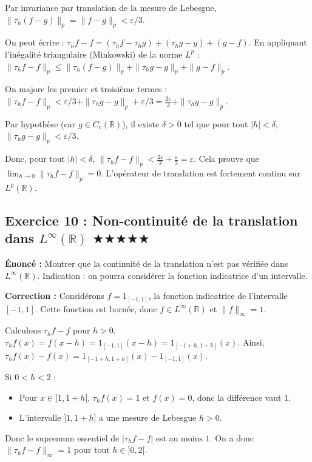 \documentclass[11pt,a4paper]{article}
\begin{document}
Par invariance par translation de la mesure de Lebesgue, $\|\tau_h(f - g)\|_p = \|f - g\|_p < \varepsilon / 3$.

On peut écrire :
$\tau_h f - f = (\tau_h f - \tau_h g) + (\tau_h g - g) + (g - f)$.
En appliquant l'inégalité triangulaire (Minkowski) de la norme $L^p$ :
$\|\tau_h f - f\|_p \le \|\tau_h(f - g)\|_p + \|\tau_h g - g\|_p + \|g - f\|_p$.

On majore les premier et troisième termes :
$\|\tau_h f - f\|_p < \varepsilon/3 + \|\tau_h g - g\|_p + \varepsilon/3 = \frac{2\varepsilon}{3} + \|\tau_h g - g\|_p$.

Par hypothèse (car $g \in C_c(\mathbb{R})$), il existe $\delta > 0$ tel que pour tout $|h| < \delta$, $\|\tau_h g - g\|_p < \varepsilon / 3$.

Donc, pour tout $|h| < \delta$, $\|\tau_h f - f\|_p < \frac{2\varepsilon}{3} + \frac{\varepsilon}{3} = \varepsilon$.
Cela prouve que $\lim_{h \to 0} \|\tau_h f - f\|_p = 0$. L'opérateur de translation est fortement continu sur $L^p(\mathbb{R})$.


\subsection*{Exercice 10 : Non-continuité de la translation dans $L^\infty(\mathbb{R})$ \quad $\bigstar\bigstar\bigstar\bigstar\bigstar$}

\textbf{Énoncé :}
Montrer que la continuité de la translation n'est pas vérifiée dans $L^\infty(\mathbb{R})$.
Indication : on pourra considérer la fonction indicatrice d'un intervalle.

\textbf{Correction :}
Considérons $f = 1_{[-1, 1]}$, la fonction indicatrice de l'intervalle $[-1, 1]$.
Cette fonction est bornée, donc $f \in L^\infty(\mathbb{R})$ et $\|f\|_\infty = 1$.

Calculons $\tau_h f - f$ pour $h > 0$.
$\tau_h f(x) = f(x-h) = 1_{[-1, 1]}(x-h) = 1_{[-1+h, 1+h]}(x)$.
Ainsi, $\tau_h f(x) - f(x) = 1_{[-1+h, 1+h]}(x) - 1_{[-1, 1]}(x)$.

Si $0 < h < 2$ :
\begin{itemize}\item Pour $x \in ]1, 1+h]$, $\tau_h f(x) = 1$ et $f(x) = 0$, donc la différence vaut $1$.
\item L'intervalle $]1, 1+h]$ a une mesure de Lebesgue $h > 0$.\end{itemize}
Donc le supremum essentiel de $|\tau_h f - f|$ est au moins $1$.
On a donc $\|\tau_h f - f\|_\infty = 1$ pour tout $h \in ]0, 2[$.
\end{document}

